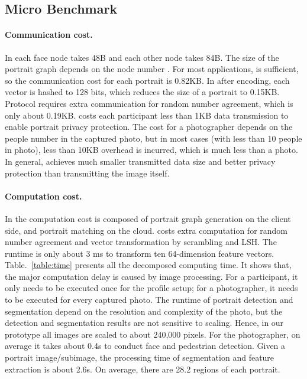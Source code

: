 \vspace{-0.1in}
\subsection{Micro Benchmark}
\vspace{-0.1in}



\paragraph{Communication cost.} In \basic each face node takes 48B and each other node takes 84B.
The size of the portrait graph depends on the node number .
For most applications,  is sufficient,
so the communication cost for each portrait is 0.82KB.
In \advanced after encoding, each vector is hashed to 128 bits,
 which reduces the size of a portrait to 0.15KB.
Protocol \advanced requires extra communication for random number agreement,
 which is only about 0.19KB.
\ourprotocol
costs each participant less than 1KB data transmission to
enable portrait privacy protection.
The cost for a photographer depends on the people number in the captured photo,
 but in most cases (with less than 10 people in photo), less than 10KB overhead is incurred, which is much less than a photo.
In general, \ourprotocol achieves much smaller transmitted data size and better privacy protection
 than transmitting the image itself.






\paragraph{Computation cost.}
In \basic the computation cost is composed of portrait graph
generation on the client side, and portrait matching on the cloud.
\advanced costs extra computation for random number agreement and vector transformation by scrambling and LSH.
The runtime is only about 3 ms to transform ten 64-dimension feature vectors.
Table.~\ref{table:time} presents all the decomposed computing time.
It shows that,
 the major computation delay is caused by image processing.
For a participant, it only needs to be executed once for the profile setup;
for a photographer, it needs to be executed for every captured photo.
The runtime of portrait detection and segmentation depend on the
resolution and complexity of the photo,
but the detection and segmentation results are not sensitive to scaling.
Hence, in our prototype all images are scaled to about 240,000 pixels.
For the photographer, on average it takes about 0.4s to conduct face
and pedestrian detection.
Given a portrait image/subimage,
the processing time of segmentation and feature extraction is about 2.6s.
On average, there are 28.2 regions of each portrait.


